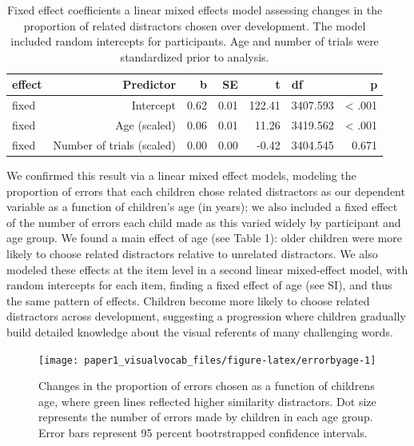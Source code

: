\documentclass[
  man,floatsintext]{apa6}
\begin{document}
\begin{table}
\centering
\caption{\label{tab:unnamed-chunk-21}Fixed effect coefficients a linear mixed effects model assessing changes in the proportion of related distractors chosen over development. The model included random intercepts for participants. Age and number of trials were standardized prior to analysis.}
\centering
\begin{tabular}[t]{lrrrrlr}
\toprule
effect & Predictor & b & SE & t & df & p\\
\midrule
fixed & Intercept & 0.62 & 0.01 & 122.41 & 3407.593 & < .001\\
fixed & Age (scaled) & 0.06 & 0.01 & 11.26 & 3419.562 & < .001\\
fixed & Number of trials (scaled) & 0.00 & 0.00 & -0.42 & 3404.545 & 0.671\\
\bottomrule
\end{tabular}
\end{table}

We confirmed this result via a linear mixed effect models, modeling the proportion of errors that each children chose related distractors as our dependent variable as a function of children's age (in years); we also included a fixed effect of the number of errors each child made as this varied widely by participant and age group. We found a main effect of age (see Table 1): older children were more likely to choose related distractors relative to unrelated distractors. We also modeled these effects at the item level in a second linear mixed-effect model, with random intercepts for each item, finding a fixed effect of age (see SI), and thus the same pattern of effects. Children become more likely to choose related distractors across development, suggesting a progression where children gradually build detailed knowledge about the visual referents of many challenging words.

\begin{figure}[H]

{\centering \texttt{[image: paper1\_visualvocab\_files/figure-latex/errorbyage-1]} 

}

\caption{Changes in the proportion of errors chosen as a function of childrens age, where green lines reflected higher similarity distractors. Dot size represents the number of errors made by children in each age group. Error bars represent 95 percent bootrstrapped confidence intervals.}\label{fig:errorbyage}
\end{figure}
\end{document}
